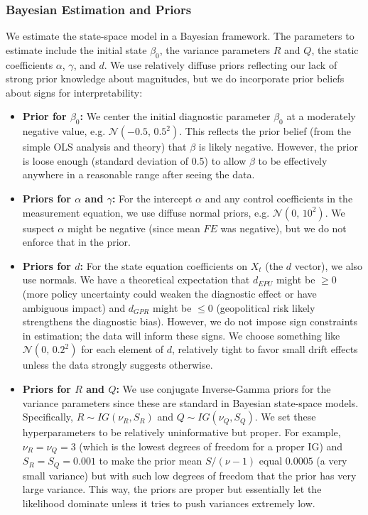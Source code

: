 \documentclass[12pt]{article}
\begin{document}
\subsubsection{Bayesian Estimation and Priors}
We estimate the state-space model in a Bayesian framework. The parameters to estimate include the initial state $\beta_0$, the variance parameters $R$ and $Q$, the static coefficients $\alpha$, $\gamma$, and $d$. We use relatively diffuse priors reflecting our lack of strong prior knowledge about magnitudes, but we do incorporate prior beliefs about signs for interpretability:
\begin{itemize}
    \item \textbf{Prior for $\beta_0$:} We center the initial diagnostic parameter $\beta_0$ at a moderately negative value, e.g. $\mathcal{N}(-0.5,\,0.5^2)$. This reflects the prior belief (from the simple OLS analysis and theory) that $\beta$ is likely negative. However, the prior is loose enough (standard deviation of 0.5) to allow $\beta$ to be effectively anywhere in a reasonable range after seeing the data.
    \item \textbf{Priors for $\alpha$ and $\gamma$:} For the intercept $\alpha$ and any control coefficients in the measurement equation, we use diffuse normal priors, e.g. $\mathcal{N}(0,\,10^2)$. We suspect $\alpha$ might be negative (since mean $FE$ was negative), but we do not enforce that in the prior.
    \item \textbf{Priors for $d$:} For the state equation coefficients on $X_t$ (the $d$ vector), we also use normals. We have a theoretical expectation that $d_{EPU}$ might be $\ge 0$ (more policy uncertainty could weaken the diagnostic effect or have ambiguous impact) and $d_{GPR}$ might be $\le 0$ (geopolitical risk likely strengthens the diagnostic bias). However, we do not impose sign constraints in estimation; the data will inform these signs. We choose something like $\mathcal{N}(0,\,0.2^2)$ for each element of $d$, relatively tight to favor small drift effects unless the data strongly suggests otherwise.
    \item \textbf{Priors for $R$ and $Q$:} We use conjugate Inverse-Gamma priors for the variance parameters since these are standard in Bayesian state-space models. Specifically, $R \sim IG(\nu_R, S_R)$ and $Q \sim IG(\nu_Q, S_Q)$. We set these hyperparameters to be relatively uninformative but proper. For example, $\nu_R = \nu_Q = 3$ (which is the lowest degrees of freedom for a proper IG) and $S_R = S_Q = 0.001$ to make the prior mean $S/(\nu-1)$ equal $0.0005$ (a very small variance) but with such low degrees of freedom that the prior has very large variance. This way, the priors are proper but essentially let the likelihood dominate unless it tries to push variances extremely low.
\end{itemize}
\end{document}
